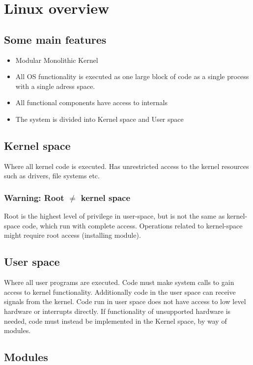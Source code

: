 \chapter{Linux overview}

\section{Some main features}

\begin{itemize}
\item Modular Monolithic Kernel
\item All OS functionality is executed as one large block of code as a single process with a single adress space. 
\item All functional components have access to internals
\item The system is divided into Kernel space and User space
\end{itemize}

\section{Kernel space}
Where all kernel code is executed. Has unrestricted access to the kernel resources such as drivers, file systems etc.

\subsection{Warning: Root $ \neq $ kernel space}
Root is the highest level of privilege in user-space, but is not the same as kernel-space code, which run with complete access. Operations related to kernel-space might require root access (installing module).

\section{User space}
Where all user programs are executed. Code must make system calls to gain access to kernel functionality. Additionally code in the user space can receive signals from the kernel. Code run in user space does not have access to low level hardware or interrupts directly. If functionality of unsupported hardware is needed, code must instead be implemented in the Kernel space, by way of modules.


\section {Modules}

